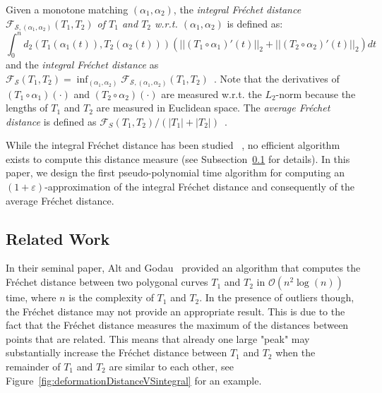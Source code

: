 \documentclass[a4paper,11pt]{article}
\begin{document}
	Given a monotone matching $\left( \alpha_1, \alpha_2 \right)$, the \emph{integral Fr\'echet distance $\mathcal{F}_{\mathcal{S},(\alpha_1,\alpha_2)} \left( T_1, T_2 \right)$ of $T_1$ and $T_2$ w.r.t. $\left( \alpha_1,\alpha_2 \right)$} is defined as:
		\begin{equation*}
			\int_{0}^n d_2( T_1 \left( \alpha_1 \left( t \right) \right), T_2 \left( \alpha_2 \left( t \right) \right)  )  \left( || \left( T_1 \circ \alpha_1 \right)' \left( t \right)||_2 + || \left( T_2 \circ \alpha_2 \right)' \left( t \right)||_2 \right) dt
		\end{equation*}
	and the \emph{integral Fr\'{e}chet distance} as $\mathcal{F}_{\mathcal{S}} \left( T_1, T_2 \right)=\inf_{(\alpha_1,\alpha_2)} \mathcal{F}_{\mathcal{S},(\alpha_1,\alpha_2)} \left( T_1, T_2 \right)$~\cite{buchin:phd}. Note that the derivatives of $(T_1 \circ \alpha_1)(\cdot)$ and $(T_2 \circ \alpha_2)(\cdot)$ are measured w.r.t. the $L_2$-norm because the lengths of $T_1$ and $T_2$ are measured in  Euclidean space.  The \emph{average Fr\'{e}chet distance} is defined as $\mathcal{F}_S (T_1,T_2) / (|T_1| + |T_2|)$~\cite{buchin:phd}.
	
	 While the integral Fr\'{e}chet distance has been studied ~\cite[p. 860]{wenk:vehicle}, no  efficient algorithm exists to compute this distance measure (see Subsection~\ref{subsec:rel} for details).  In this paper, we design  the first pseudo-polynomial time algorithm for computing an $(1+ \varepsilon)$-approximation of the integral Fr\'{e}chet distance and consequently of the average Fr\'{e}chet distance.\\
\subsection{Related Work} \label{subsec:rel} 


In their seminal paper, Alt and Godau~\cite{alt:computing} provided an algorithm that computes the Fr\'{e}chet distance between two polygonal curves $T_1$ and $T_2$ in $\mathcal{O}(n^2 \log (n))$ time, where $n$ is the complexity of $T_1$ and $T_2$. In the presence of outliers though, the Fr\'{e}chet distance may not provide an appropriate result. This is due to the fact that the Fr\'{e}chet distance measures the maximum of the distances between points that are related. This means that already one large  "peak"  may substantially increase the Fr\'{e}chet distance between $T_1$ and $T_2$ when the remainder of $T_1$ and $T_2$ are similar to each other, see Figure~\ref{fig:deformationDistanceVSintegral} for an example.
	
\end{document}
